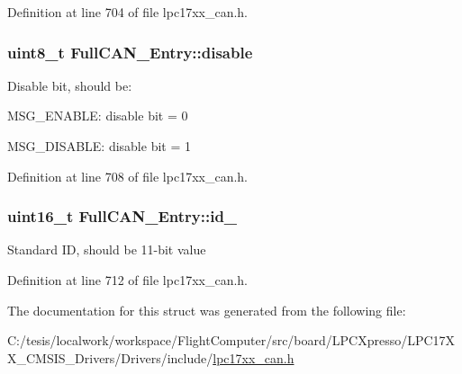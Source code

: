 \-Definition at line 704 of file lpc17xx\-\_\-can.\-h.

\hypertarget{struct_full_c_a_n___entry_ab20e4f85051501294cf457415481bf0c}{
\subsubsection[{disable}]{\setlength{\rightskip}{0pt plus 5cm}uint8\-\_\-t {\bf \-Full\-C\-A\-N\-\_\-\-Entry\-::disable}}}\label{struct_full_c_a_n___entry_ab20e4f85051501294cf457415481bf0c}
\-Disable bit, should be\-:
\begin{DoxyItemize}
\item \-M\-S\-G\-\_\-\-E\-N\-A\-B\-L\-E\-: disable bit = 0
\item \-M\-S\-G\-\_\-\-D\-I\-S\-A\-B\-L\-E\-: disable bit = 1 
\end{DoxyItemize}

\-Definition at line 708 of file lpc17xx\-\_\-can.\-h.

\hypertarget{struct_full_c_a_n___entry_a9e09f31a75a386c226c9e681b9040566}{
\subsubsection[{id\-\_\-11}]{\setlength{\rightskip}{0pt plus 5cm}uint16\-\_\-t {\bf \-Full\-C\-A\-N\-\_\-\-Entry\-::id\-\_}}}\label{struct_full_c_a_n___entry_a9e09f31a75a386c226c9e681b9040566}
\-Standard \-I\-D, should be 11-\/bit value 

\-Definition at line 712 of file lpc17xx\-\_\-can.\-h.



\-The documentation for this struct was generated from the following file\-:\begin{DoxyCompactItemize}
\item 
\-C\-:/tesis/localwork/workspace/\-Flight\-Computer/src/board/\-L\-P\-C\-Xpresso/\-L\-P\-C17\-X\-X\-\_\-\-C\-M\-S\-I\-S\-\_\-\-Drivers/\-Drivers/include/\hyperlink{lpc17xx__can_8h}{lpc17xx\-\_\-can.\-h}\end{DoxyCompactItemize}
